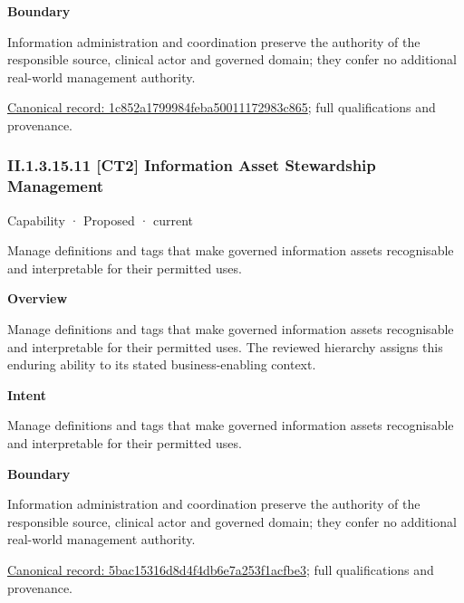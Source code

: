 \textbf{Boundary}



Information administration and coordination preserve the authority of the responsible source, clinical actor and governed domain; they confer no additional real-world management authority.


{\footnotesize \href{../../../../continuum/strategy/capability/1c852a1799984feba50011172983c865.md}{Canonical record: 1c852a1799984feba50011172983c865}; full qualifications and provenance.}\par
\subsubsection*{II.1.3.15.11 [CT2] Information Asset Stewardship Management}
\label{navigation:II.1.3.15.11}

\label{element:5bac15316d8d4f4db6e7a253f1acfbe3}
{\small Capability · Proposed · current}\par

Manage definitions and tags that make governed information assets recognisable and interpretable for their permitted uses.



\textbf{Overview}



Manage definitions and tags that make governed information assets recognisable and interpretable for their permitted uses. The reviewed hierarchy assigns this enduring ability to its stated business-enabling context.



\textbf{Intent}



Manage definitions and tags that make governed information assets recognisable and interpretable for their permitted uses.



\textbf{Boundary}



Information administration and coordination preserve the authority of the responsible source, clinical actor and governed domain; they confer no additional real-world management authority.


{\footnotesize \href{../../../../continuum/strategy/capability/5bac15316d8d4f4db6e7a253f1acfbe3.md}{Canonical record: 5bac15316d8d4f4db6e7a253f1acfbe3}; full qualifications and provenance.}\par
